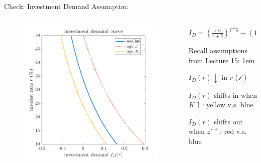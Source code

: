 \documentclass[11pt,aspectratio=43]{beamer}
\let\olditemize=\itemize
\let\endolditemize=\enditemize
\renewenvironment{itemize}{\olditemize \itemsep1em}{\endolditemize}
\theoremstyle{definition}
\begin{document}
\begin{frame}{Check: Investment Demand Assumption}
\label{slide:Check__Investment_Demand_Assumption}
    \begin{columns}
        \begin{column}{0.5\textwidth}
            \begin{figure}
                \includegraphics[width=\textwidth]{./figures/InvestmentDemand.png}
            \end{figure}
        \end{column}
        \begin{column}{0.5\textwidth}
            \begin{center}
                $ \displaystyle
                I_{D} = \left(
                        \frac{z' \alpha}{r+\delta}
                    \right)^{\frac{1}{1-\alpha}}
                    - ( 1-\delta )K
                $
            \end{center}
            Recall assumptions from Lecture 15:
            \begin{itemize}
                \item $ I_{D}( r ) \downarrow $ in $ r $ ($\checkmark$)
                \item $ I_{D}( r ) $ shifts in when $ K \uparrow $: yellow v.s. blue
                \item $ I_{D}( r ) $ shifts out when $ z' \uparrow  $: red v.s. blue
            \end{itemize}
        \end{column}
    \end{columns}
\end{frame}
\end{document}
